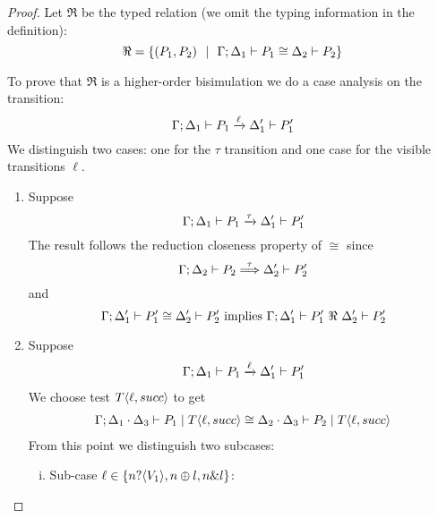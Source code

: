 \begin{proof}
	\noi Let $\Re$ be the typed relation (we omit the typing information in the definition):
	\[
		\Re = \{(P_1, P_2) \ \ |\ \  \Gamma; \Delta_1 \vdash P_1 \cong \Delta_2 \vdash P_2\}
	\]

	To prove that $\Re$ is a higher-order bisimulation
	we do a case analysis on the transition:
	\[
		\Gamma; \Delta_1 \vdash P_1 \xrightarrow{\ell} \Delta_1' \vdash P_1'
	\]
	We distinguish two cases: one for the $\tau$ transition and one case for
	the visible transitions $\ell$.

\begin{enumerate}
	\item Suppose 
			\[
				\Gamma; \Delta_1 \vdash P_1 \xrightarrow{\tau} \Delta_1' \vdash P_1'
			\]
			\noi The result follows the reduction closeness property of $\cong$ since
			\[
				\Gamma; \Delta_2 \vdash P_2 \stackrel{\tau}{\Longrightarrow} \Delta_2' \vdash P_2'
			\]
			\noi and
			\[
				\horel{\Gamma}{\Delta_1'}{P_1'}{\cong}{\Delta_2'}{P_2'} \text{ implies } \horel{\Gamma}{\Delta_1'}{P_1'}{\ \Re\ }{\Delta_2'}{P_2'}
			\]

	\item Suppose
			\begin{eqnarray}
				\Gamma; \Delta_1 \vdash P_1 \xrightarrow{\ell} \Delta_1' \vdash P_1'
				\label{lem:cong_is_wb1}
			\end{eqnarray}
			\noi We choose test $T\langle \ell, succ \rangle$ to get
			\begin{eqnarray}
				\Gamma; \Delta_1 \cdot \Delta_3 \vdash P_1 \;|\; T\langle \ell, succ \rangle \cong \Delta_2 \cdot \Delta_3 \vdash P_2 \;|\; T\langle \ell, succ \rangle
				\label{lem:cong_is_wb2}
			\end{eqnarray}
			\noi From this point we distinguish two subcases:

			\begin{enumerate}[i.]
				\item	Sub-case $\ell \in \{n ? \langle V_1 \rangle, n \oplus l, n \& l\}$:


\end{enumerate}
\end{enumerate}
\end{proof}

